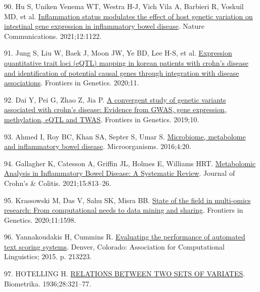 \documentclass[
  12pt,
  a4paper,
  twoside,
  openright]{book}
\newlength{\cslhangindent}
\newlength{\cslentryspacingunit} %
\newenvironment{CSLReferences}[2] %
 {%
  \setlength{\parindent}{0pt}
  \ifodd #1
  \let\oldpar\par
  \def\par{\hangindent=\cslhangindent\oldpar}
  \fi
  \setlength{\parskip}{#2\cslentryspacingunit}
 }%
 {}
\begin{document}
\begin{CSLReferences}{0}{0}
\leavevmode{}%
90. Hu S, Uniken Venema WT, Westra H-J, Vich Vila A, Barbieri R, Voskuil MD, et al. \href{https://doi.org/10.1038/s41467-021-21458-z}{Inflammation status modulates the effect of host genetic variation on intestinal gene expression in inflammatory bowel disease}. Nature Communications. 2021;12:1122.

\leavevmode{}%
91. Jung S, Liu W, Baek J, Moon JW, Ye BD, Lee H-S, et al. \href{https://www.frontiersin.org/article/10.3389/fgene.2020.00486}{Expression quantitative trait loci (eQTL) mapping in korean patients with crohn{'}s disease and identification of potential causal genes through integration with disease associations}. Frontiers in Genetics. 2020;11.

\leavevmode{}%
92. Dai Y, Pei G, Zhao Z, Jia P. \href{https://www.frontiersin.org/article/10.3389/fgene.2019.00318}{A convergent study of genetic variants associated with crohn{'}s disease: Evidence from GWAS, gene expression, methylation, eQTL and TWAS}. Frontiers in Genetics. 2019;10.

\leavevmode{}%
93. Ahmed I, Roy BC, Khan SA, Septer S, Umar S. \href{https://doi.org/10.3390/microorganisms4020020}{Microbiome, metabolome and inflammatory bowel disease}. Microorganisms. 2016;4:20.

\leavevmode{}%
94. Gallagher K, Catesson A, Griffin JL, Holmes E, Williams HRT. \href{https://doi.org/10.1093/ecco-jcc/jjaa227}{Metabolomic Analysis in Inflammatory Bowel Disease: A Systematic Review}. Journal of Crohn's \& Colitis. 2021;15:813--26.

\leavevmode{}%
95. Krassowski M, Das V, Sahu SK, Misra BB. \href{https://doi.org/10.3389/fgene.2020.610798}{State of the field in multi-omics research: From computational needs to data mining and sharing}. Frontiers in Genetics. 2020;11:1598.

\leavevmode{}%
96. Yannakoudakis H, Cummins R. \href{https://doi.org/10.3115/v1/W15-0625}{Evaluating the performance of automated text scoring systems}. Denver, Colorado: Association for Computational Linguistics; 2015. p. 213223.

\leavevmode{}%
97. HOTELLING H. \href{https://doi.org/10.1093/biomet/28.3-4.321}{RELATIONS BETWEEN TWO SETS OF VARIATES}. Biometrika. 1936;28:321--77.


\end{CSLReferences}
\end{document}
